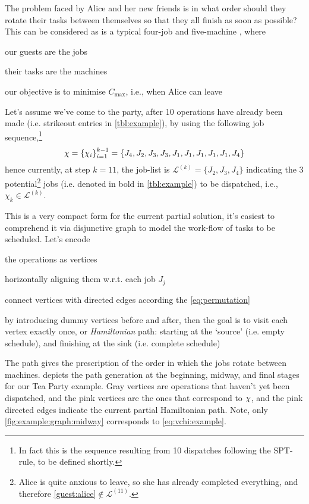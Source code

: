 The problem faced by Alice and her new friends is in what order should they 
rotate their tasks between themselves so that they all finish as soon as 
possible? This can be considered as is a typical four-job and five-machine 
\jsp, where
\begin{enumerate*}[label={{}}]
    \item our guests are the jobs
    \item their tasks are the machines
    \item our objective is to minimise $C_{\max}$, i.e., when Alice can 
    leave
\end{enumerate*}

Let's assume we've come to the party, after 10 operations have already been 
made (i.e. strikeout entries in \cref{tbl:example}), by using the following 
job sequence,\footnote{In fact this is the sequence resulting from 10 
    dispatches following the SPT-rule, to be defined shortly.}
\begin{equation}
\vchi = \left\{ \chi_i \right\}_{i=1}^{k-1} \label{eq:vchi:example}
= \left\{ J_4,J_2,J_3,J_3,J_1,J_1,J_1,J_1,J_1,J_4 \right\}
\end{equation}
hence currently, at step $k=11$, the job-list is 
$\mathcal{L}^{(k)}=\{J_2,J_3,J_4\}$ indicating the 3 potential\footnote{
    Alice is quite anxious to leave, so she has already completed everything, 
    and 
    therefore \ref{guest:alice}$\notin\mathcal{L}^{(11)}$.} 
jobs (i.e. denoted in bold in \cref{tbl:example}) to be dispatched, i.e., 
$\chi_k\in\mathcal{L}^{(k)}$.



This is a very compact form for the current partial solution, it's easiest to 
comprehend it via disjunctive graph \citep{roy64} to model the work-flow of 
tasks to be scheduled.
Let's encode
\begin{enumerate*}
    \item the operations as vertices
    \item horizontally aligning them w.r.t. each job $J_j$
    \item connect vertices with directed edges according the 
    \cref{eq:permutation}
    \item by introducing dummy vertices before and after, then the goal is to 
    visit each vertex exactly once, or \emph{Hamiltonian} path: starting at the 
    `source'  (i.e. empty schedule), and finishing at the sink (i.e. complete 
    schedule)
\end{enumerate*}
The path gives the prescription of the order in which the jobs rotate 
between machines. 
 depicts the path generation at the beginning, midway, 
and final stages for our Tea Party example. 
Gray vertices are operations that haven't yet been dispatched, and the pink 
vertices are the ones that correspond to ${\mathbf{\chi}}$, 
and the pink directed edges indicate the current partial Hamiltonian path.
Note, only \cref{fig:example:graph:midway} corresponds to 
\cref{eq:vchi:example}.

